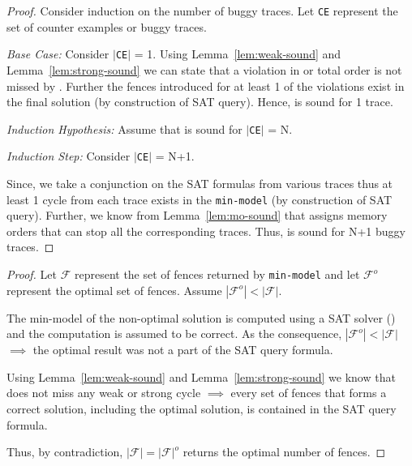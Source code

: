 {}
\begin{proof}
	Consider induction on the number of buggy traces. 
	Let {\tt CE} represent the set of counter examples or buggy traces.
	
	\noindent
	{\sl Base Case:} Consider $|${\tt CE}$|$ = 1. 
	Using Lemma~\ref{lem:weak-sound} and Lemma~\ref{lem:strong-sound}
	we can state that a violation in  or
	\sc total order is not missed by \ourtechnique. \newline
	Further the fences introduced for at least 1 of the violations
	exist in the final solution (by construction of SAT query).
	\newline
	Hence, \ourtechnique is sound for 1 trace.\newline
	
	\noindent 
	{\sl Induction Hypothesis:}
	Assume that \ourtechnique is sound for $|${\tt CE}$|$ = N.
	\newline
	
	\noindent
	{\sl Induction Step:}
	Consider $|${\tt CE}$|$ = N+1.
	
	Since, we take a conjunction on the SAT formulas from various
	traces thus at least 1 cycle from each trace exists in the 
	{\tt min-model} (by construction of SAT query).\newline
	Further, we know from Lemma~\ref{lem:mo-sound} that \ourtechnique
	assigns memory orders that can stop all the corresponding traces.
	\newline
	Thus, \ourtechnique is sound for N+1 buggy traces.
\end{proof}

{
	\label{lem:opt-num}}
\begin{proof}
	Let $\mathcal{F}$ represent the set of fences returned by
	{\tt min-model} and let $\mathcal{F}^o$ represent the optimal set
	of fences. Assume $|\mathcal{F}^o| < |\mathcal{F}|$.
	
	The min-model of the non-optimal solution is computed using a
	SAT solver (\z) and the computation is assumed to be correct. 
	As the consequence,
	$|\mathcal{F}^o| < |\mathcal{F}|$ $\implies$ the optimal result
	was not a part of the SAT query formula.
	
	Using Lemma~\ref{lem:weak-sound} and 
	Lemma~\ref{lem:strong-sound} we know that \ourtechnique does 
	not miss any weak or strong cycle
	$\implies$ every set of fences that forms a correct solution,
	including the optimal solution, is contained in the SAT query
	formula.
	
	Thus, by contradiction, $|\mathcal{F}| = |\mathcal{F}|^o$ 
	 returns the optimal number of fences.
\end{proof}

